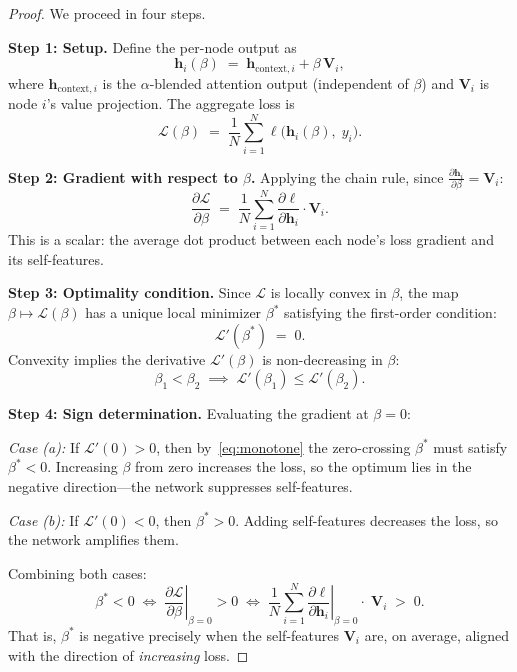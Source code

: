 \begin{proof}
We proceed in four steps.

\medskip
\noindent\textbf{Step 1: Setup.}
Define the per-node output as
\begin{equation}
\mathbf{h}_i(\beta) \;=\; \mathbf{h}_{\text{context},i} + \beta\,\mathbf{V}_i,
\end{equation}
where $\mathbf{h}_{\text{context},i}$ is the $\alpha$-blended attention output (independent of $\beta$) and $\mathbf{V}_i$ is node $i$'s value projection. The aggregate loss is
\begin{equation}
\mathcal{L}(\beta) \;=\; \frac{1}{N}\sum_{i=1}^{N} \ell\bigl(\mathbf{h}_i(\beta),\; y_i\bigr).
\end{equation}

\noindent\textbf{Step 2: Gradient with respect to $\beta$.}
Applying the chain rule, since $\frac{\partial \mathbf{h}_i}{\partial \beta} = \mathbf{V}_i$:
\begin{equation}
\frac{\partial \mathcal{L}}{\partial \beta} \;=\; \frac{1}{N}\sum_{i=1}^{N} \frac{\partial \ell}{\partial \mathbf{h}_i} \cdot \mathbf{V}_i.
\label{eq:beta_grad}
\end{equation}
This is a scalar: the average dot product between each node's loss gradient and its self-features.

\medskip
\noindent\textbf{Step 3: Optimality condition.}
Since $\mathcal{L}$ is locally convex in $\beta$, the map $\beta \mapsto \mathcal{L}(\beta)$ has a unique local minimizer $\beta^*$ satisfying the first-order condition:
\begin{equation}
\mathcal{L}'(\beta^*) \;=\; 0.
\end{equation}
Convexity implies the derivative $\mathcal{L}'(\beta)$ is non-decreasing in $\beta$:
\begin{equation}
\beta_1 < \beta_2 \;\implies\; \mathcal{L}'(\beta_1) \leq \mathcal{L}'(\beta_2).
\label{eq:monotone}
\end{equation}

\noindent\textbf{Step 4: Sign determination.}
Evaluating the gradient at $\beta = 0$:

\emph{Case (a):} If $\mathcal{L}'(0) > 0$, then by~\eqref{eq:monotone} the zero-crossing $\beta^*$ must satisfy $\beta^* < 0$. Increasing $\beta$ from zero increases the loss, so the optimum lies in the negative direction---the network suppresses self-features.

\emph{Case (b):} If $\mathcal{L}'(0) < 0$, then $\beta^* > 0$. Adding self-features decreases the loss, so the network amplifies them.

\medskip
\noindent Combining both cases:
\begin{equation}
\beta^* < 0 \;\iff\; \left.\frac{\partial \mathcal{L}}{\partial \beta}\right|_{\beta=0} > 0 \;\iff\; \frac{1}{N}\sum_{i=1}^{N} \left.\frac{\partial \ell}{\partial \mathbf{h}_i}\right|_{\beta=0} \!\!\cdot\; \mathbf{V}_i \;>\; 0.
\end{equation}
That is, $\beta^*$ is negative precisely when the self-features $\mathbf{V}_i$ are, on average, aligned with the direction of \emph{increasing} loss.
\end{proof}

